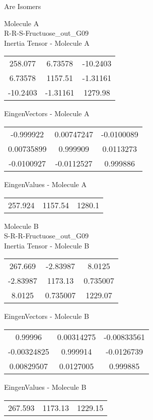 \begin{center}
\vtab
\vtab
\textcolor{NavyBlue}{\Large Are Isomers}
\end{center}
\newpage
\begin{multicols}{2}
\begin{center}
Molecule A \\ 
R-R-S-Fructuose\_out\_G09
\\
Inertia Tensor - Molecule A \\
\vtab
\begin{tabular}{|c c c|}
258.077	 & 	6.73578	 & 	-10.2403	 \\
6.73578	 & 	1157.51	 & 	-1.31161	 \\
-10.2403	 & 	-1.31161	 & 	1279.98
\end{tabular}

\vtab
 EingenVectors - Molecule A     \\
\vtab
\begin{tabular}{|c c c|}
-0.999922	 & 	0.00747247	 & 	-0.0100089	 \\
0.00735899	 & 	0.999909	 & 	0.0113273	 \\
-0.0100927	 & 	-0.0112527	 & 	0.999886
\end{tabular}

\vtab
 EingenValues - Molecule A     \\
\vtab
\begin{tabular}{|c c c|}
257.924	 & 	1157.54	 & 	1280.1
\end{tabular}
\columnbreak

Molecule B \\ 
S-R-R-Fructuose\_out\_G09
\\
Inertia Tensor - Molecule B \\
\vtab
\begin{tabular}{|c c c|}
267.669	 & 	-2.83987	 & 	8.0125	 \\
-2.83987	 & 	1173.13	 & 	0.735007	 \\
8.0125	 & 	0.735007	 & 	1229.07
\end{tabular}

\vtab
 EingenVectors - Molecule B     \\
\vtab
\begin{tabular}{|c c c|}
0.99996	 & 	0.00314275	 & 	-0.00833561	 \\
-0.00324825	 & 	0.999914	 & 	-0.0126739	 \\
0.00829507	 & 	0.0127005	 & 	0.999885
\end{tabular}

\vtab
 EingenValues - Molecule B     \\
\vtab
\begin{tabular}{|c c c|}
267.593	 & 	1173.13	 & 	1229.15
\end{tabular}

\end{center}
\end{multicols}
